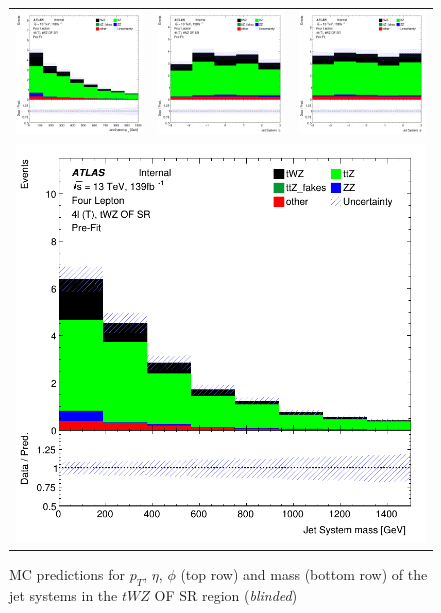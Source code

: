 \begin{figure}[htbp]
\centering
  \begin{tabular}{ccc}

    \includegraphics[width=.2\textwidth]{figures/PreFitPlots/lep4_tWZ_4T_OF_Jet_sys_Pt}&
    \includegraphics[width=.2\textwidth]{figures/PreFitPlots/lep4_tWZ_4T_OF_Jet_sys_Eta} &
    \includegraphics[width=.2\textwidth]{figures/PreFitPlots/lep4_tWZ_4T_OF_Jet_sys_Phi} \\
    \multicolumn{3}{c}{\includegraphics[width=.2\textwidth]{figures/PreFitPlots/lep4_tWZ_4T_OF_Jet_sys_mass}}

  \end{tabular}
  \caption{MC predictions for $p_{T}$, $\eta$, $\phi$ (top row) and mass (bottom row) of the jet systems in the $tWZ$ OF SR region (\textit{blinded})}
  \label{fig:4lep-OF-SR-jet-sys-Plots}
\end{figure}


